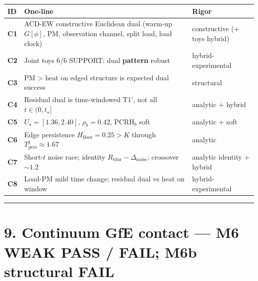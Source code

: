 \documentclass[
  11pt,
]{article}
\newcounter{none} %
\begin{document}
{\def\LTcaptype{none} %
\begin{longtable}[]{@{}
  >{\raggedright\arraybackslash}p{}
  >{\raggedright\arraybackslash}p{}
  >{\raggedright\arraybackslash}p{}@{}}
\toprule\noalign{}
\begin{minipage}[b]{\linewidth}\raggedright
ID
\end{minipage} & \begin{minipage}[b]{\linewidth}\raggedright
One-line
\end{minipage} & \begin{minipage}[b]{\linewidth}\raggedright
Rigor
\end{minipage} \\
\midrule\noalign{}
\endhead
\bottomrule\noalign{}
\endlastfoot
\textbf{C1} & ACD-EW constructive Euclidean dual (warm-up \(G[\phi]\),
PM, observation channel, split load, load clock) & constructive (+ toys
hybrid) \\
\textbf{C2} & Joint toys 6/6 SUPPORT: dual \textbf{pattern} robust &
hybrid-experimental \\
\textbf{C3} & PM \textgreater{} heat on edged structure is expected dual
success & structural \\
\textbf{C4} & Residual dual is time-windowed T1', not all
\(t\in(0,t_\star]\) & analytic + hybrid \\
\textbf{C5} & \(U_\star=[1.36,2.40]\), \(\rho_b=0.42\), PCRH\(_b\) soft
& analytic + soft \\
\textbf{C6} & Edge persistence \(H_{\mathrm{floor}}=0.25>K\) through
\(T_{\mathrm{pers}}^\sharp\approx 1.67\) & analytic \\
\textbf{C7} & Short-\(t\) noise race; identity
\(R_{\mathrm{blur}}-\Delta_{\mathrm{noise}}\); crossover \(\sim 1.2\) &
analytic identity + hybrid \\
\textbf{C8} & Load-PM mild time change; residual dual vs heat on window
& hybrid-experimental \\
\end{longtable}
}

\begin{center}\rule{0.5\linewidth}{0.5pt}\end{center}

\section{9. Continuum GfE contact --- M6 WEAK PASS / FAIL; M6b
structural
FAIL}\label{continuum-gfe-contact-m6-weak-pass-fail-m6b-structural-fail}
\end{document}
